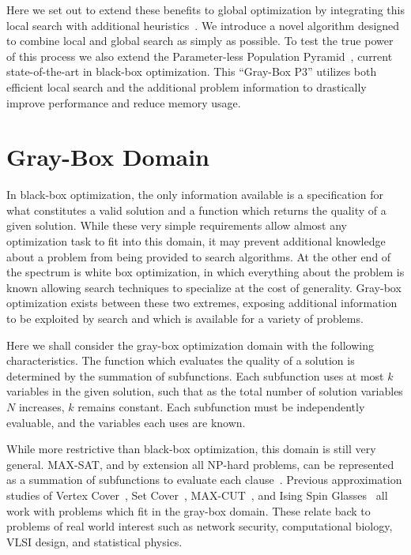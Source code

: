 \documentclass{sig-alternate}
\begin{document}
Here we set out to extend these benefits to global optimization by integrating
this local search with additional heuristics~\cite{chen:2011:memetic}.
We introduce a novel algorithm designed to combine local
and global search as simply as possible. To test the true power of this
process we also extend the Parameter-less Population Pyramid~\cite{goldman:2014:p3},
current state-of-the-art in black-box optimization. This ``Gray-Box P3''
utilizes both efficient local search and the additional problem information
to drastically improve performance and reduce memory usage.

\section{Gray-Box Domain}
\label{sec-gray-box}
In black-box optimization, the only information available is a specification
for what constitutes a valid solution and a function which returns the quality
of a given solution. While these very simple requirements allow almost any
optimization task to fit into this domain, it may prevent additional knowledge
about a problem from being provided to search algorithms. At the other end of
the spectrum is white box optimization, in which everything about the problem
is known allowing search techniques to specialize at the cost of generality.
Gray-box optimization exists between these two extremes, exposing additional
information to be exploited by search and which is available for a variety of problems.

Here we shall consider the gray-box optimization domain with the following
characteristics. The function which evaluates the quality of a solution is determined by the summation
of subfunctions. Each subfunction uses at most $k$ variables in the given solution,
such that as the total number of solution variables $N$ increases, $k$ remains constant.
Each subfunction must be independently evaluable, and the variables each uses are known.

While more restrictive than black-box optimization, this domain is still very general.
MAX-SAT, and by extension all NP-hard problems, can be represented
as a summation of subfunctions to evaluate each clause~\cite{whitley:2013:greedy}.
Previous approximation studies of Vertex Cover~\cite{oliveto:2009:vertexcover},
Set Cover~\cite{yu:2010:setcover}, MAX-CUT~\cite{festa:2002:maxcut}, and
Ising Spin Glasses~\cite{pelikan:2003:hboaising} all work with problems which fit
in the gray-box domain. These relate back to problems of real world interest such
as network security, computational biology, VLSI design, and statistical physics.
\end{document}
